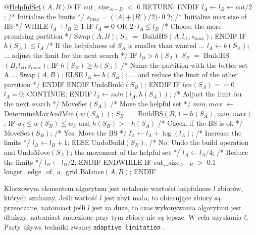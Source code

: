\newpage

\begin{pseudocode}
@\underline{HelpfulSet$(A,B)$}@
  IF cut_size$_{A-B}$ $<$ $0$
    RETURN;
  ENDIF
  $l_A \leftarrow l_B \leftarrow cut/2$;                        /* Initialize the limits */
  $s_{max} = (|A| + |B|) / 2) \cdot 0.2$;                /* Initialize max size of HS */
  WHILE $l_A + l_B \geq 1$
    IF $l_A = 0$ OR $2 \cdot l_A \leq l_B$  /* Choose the more promising partition */
      Swap$(A,B)$;
    $S_A$ $=$ BuildHS$(A, l_A, s_{max})$;
    ENDIF
    IF $h(S_A) \leq l_A$ /* If the helpfulness of $S_A$ is smaller than wanted ...
      $l_A \leftarrow b(S_A)$;          ... adjust the limit for the next search */
      IF $l_B > h(S_A)$
        $S_B$ $=$ BuildHS$(B, l_B, s_{max})$;
        IF $h(S_B) \geq h(S_A)$ /* Name the partition with the better set A ...
          Swap$(A, B)$;
        ELSE
          $l_B \leftarrow b(S_B)$; ... and reduce the limit of the other partition */
        ENDIF
      ENDIF
      UndoBuild$(S_B)$;
    ENDIF
    IF $len(S_A) == 0$
      $l_A = 0$;
      CONTINUE;
    ENDIF
    $l_A \leftarrow min(l_A,h(S_A))$;          /* Adjust the limit for the next search */
    MoveSet$(S_A)$                             /* Move the helpful set */
    $min, max$ $\leftarrow$ DetermineMaxAndMin$(w(S_A))$;
    $S_B$ $=$ BuildBS$(B,1 - h(S_A),min,max)$;
    IF $w_l \leq w(S_B) \leq w_h$ and $h(S_B) > -h(S_A)$  /* Check, if the BS is ok */
      MoveSet$(S_B)$;                       /* Yes: Move the BS */
      $l_A \leftarrow l_A + \log(l_A)$;                  /* Increase the limits */
      $l_B \leftarrow l_B + 1$;
    ELSE
      UndoBuild$(S_B)$;           /* No: Undo the build operation and
      UndoMove$(S_A)$;              the movement of the helpful set */
      $l_A \leftarrow l_A/4$;                            /* Reduce the limits */
      $l_B \leftarrow l_B/2$;
    ENDIF
  ENDWHILE
  IF cut_size$_{A-B}$ $>$ $0.1$ $\cdot$ longer_edge_of_a_grid
    Balance$(A, B)$;
  ENDIF
\end{pseudocode}
\vspace{-8mm}
\label{code:helpful_sets}
\newpage
Kluczowym elementem algorytmu jest ustalenie wartości helpfulness $l$ zbiorów, których szukamy.
Jeśli wartość $l$ jest zbyt mała, to obiecujące zbiory są przeoczane, natomiast jeśli $l$ jest za duże,
to czas wykonywania algorytmu jest dłuższy, natomiast znalezione przy tym zbiory nie są lepsze.
W celu uzyskania $l$, Party używa techniki zwanej \texttt{adaptive limitation} \cite{article}.
